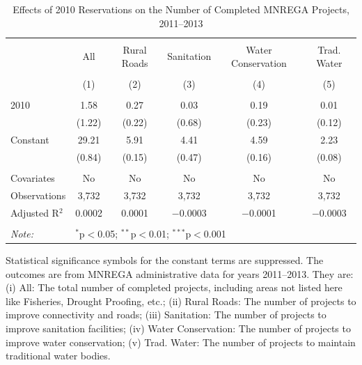 \begin{table}[!htbp]
\centering
\begin{threeparttable}

  \caption{Effects of 2010 Reservations on the Number of Completed MNREGA Projects, 2011--2013} 
  \label{main_mnrega_10} 
\scriptsize 
\begin{tabular}{@{\extracolsep{0pt}}lccccc} 
\\[-1.8ex]\hline 
\hline \\[-1.8ex] 
 & All & Rural Roads & Sanitation & Water Conservation & Trad. Water \\ 
\\[-1.8ex] & (1) & (2) & (3) & (4) & (5)\\ 
\hline \\[-1.8ex] 
 2010 & 1.58 & 0.27 & 0.03 & 0.19 & 0.01 \\ 
  & (1.22) & (0.22) & (0.68) & (0.23) & (0.12) \\ 
  Constant & 29.21 & 5.91 & 4.41 & 4.59 & 2.23 \\ 
  & (0.84) & (0.15) & (0.47) & (0.16) & (0.08) \\ 
 \hline \\[-1.8ex] 
Covariates & No & No & No & No & No \\ 
Observations & 3,732 & 3,732 & 3,732 & 3,732 & 3,732 \\ 
Adjusted R$^{2}$ & 0.0002 & 0.0001 & $-$0.0003 & $-$0.0001 & $-$0.0003 \\ 
\hline 
\hline \\[-1.8ex] 
\textit{Note:}  & \multicolumn{5}{l}{$^{*}$p$<$0.05; $^{**}$p$<$0.01; $^{***}$p$<$0.001} \\ 
\end{tabular} 
\begin{tablenotes}[flushleft]
\scriptsize
\item[] Statistical significance symbols for the constant terms are suppressed. The outcomes are from MNREGA administrative data for years 2011--2013. They are: 
(i) All: The total number of completed projects, including areas not listed here like Fisheries, Drought Proofing, etc.;
(ii) Rural Roads: The number of projects to improve connectivity and roads;
(iii) Sanitation: The number of projects to improve sanitation facilities;
(iv) Water Conservation: The number of projects to improve water conservation;
(v) Trad. Water: The number of projects to maintain traditional water bodies.
\end{tablenotes}
\end{threeparttable}
\end{table}
